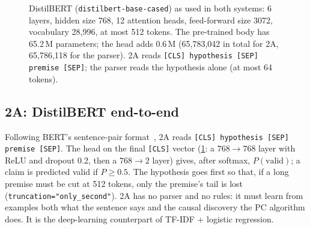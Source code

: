 \documentclass[12pt,a4paper]{article}
\newcommand{\code}[1]{\texttt{#1}}
\begin{document}
\begin{figure}[!htbp]
{}
\caption{DistilBERT (\code{distilbert-base-cased}) as used in both systems: 6 layers, hidden size 768, 12 attention heads,
feed-forward size 3072, vocabulary 28,996, at most 512 tokens. The pre-trained body has 65.2\,M parameters; the head adds
0.6\,M (65,783,042 in total for 2A, 65,786,118 for the parser). 2A reads \code{[CLS] hypothesis [SEP] premise [SEP]};
the parser reads the hypothesis alone (at most 64 tokens).}
\label{fig:distilbert}
\end{figure}

\subsection{2A: DistilBERT end-to-end}\label{sec:arch2a}
Following BERT's sentence-pair format~\cite{devlin2019}, 2A reads
\code{[CLS] hypothesis [SEP] premise [SEP]}. The head on the final \code{[CLS]} vector (\cref{fig:distilbert}: a
$768\to768$ layer with ReLU and dropout 0.2, then a $768\to2$ layer) gives, after softmax,
$P(\text{valid})$; a claim is predicted valid if $P\ge0.5$. The hypothesis goes first so that, if a long premise must be cut
at 512 tokens, only the premise's tail is lost (\code{truncation="only\_second"}). 2A has no parser and no rules: it must learn
from examples both what the sentence says and the causal discovery the PC algorithm does. It is the deep-learning counterpart of
TF-IDF + logistic regression.
\end{document}
